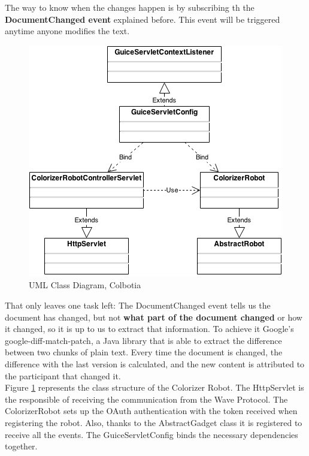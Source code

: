The way to know when the changes happen is by subscribing th the \textbf{DocumentChanged event} explained before. This event will be triggered anytime anyone modifies the text.\\[.2cm]
\begin{figure}[H]
  \center
    \includegraphics[keepaspectratio, scale=0.5]{Media/Diagrams/Robot/Colorizer.png}
  \caption{UML Class Diagram, Colbotia}
  \label{fig:colorizer_diagram}
\end{figure}
That only leaves one task left: The DocumentChanged event tells us the document has changed, but not \textbf{what part of the document changed} or how it changed, so it is up to us to extract that information. To achieve it Google's google-diff-match-patch, a Java library that is able to extract the difference between two chunks of plain text. Every time the document is changed, the difference with the last version is calculated, and the new content is attributed to the participant that changed it.\\[.2cm]
Figure \ref{fig:colorizer_diagram} represents the class structure of the Colorizer Robot. The HttpServlet is the responsible of receiving the communication from the Wave Protocol. The ColorizerRobot sets up the OAuth authentication with the token received when registering the robot. Also, thanks to the AbstractGadget class it is registered to receive all the events. The GuiceServletConfig binds the necessary dependencies together.
